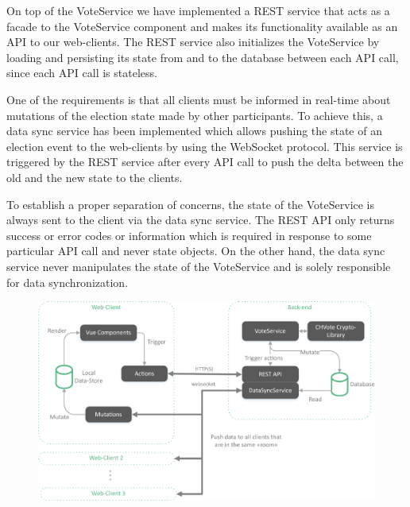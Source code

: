 On top of the VoteService we have implemented a REST service that acts as a facade to the VoteService component and makes its functionality available as an API to our web-clients. The REST service also initializes the VoteService by loading and persisting its state from and to the database between each API call, since each API call is stateless.

One of the requirements is that all clients must be informed in real-time about mutations of the election state made by other participants. To achieve this, a data sync service has been implemented which allows pushing the state of an election event to the web-clients by using the WebSocket protocol. This service is triggered by the REST service after every API call to push the delta between the old and the new state to the clients.

To establish a proper separation of concerns, the state of the VoteService is always sent to the client via the data sync service. The REST API only returns success or error codes or information which is required in response to some particular API call and never state objects. On the other hand, the data sync service never manipulates the state of the VoteService and is solely responsible for data synchronization.

\begin{figure}[h!]
\begin{center}
\includegraphics[scale=0.7]{assets/chvoteArchitecture.pdf}
\label{Architecture}%
\end{center}
\end{figure}

